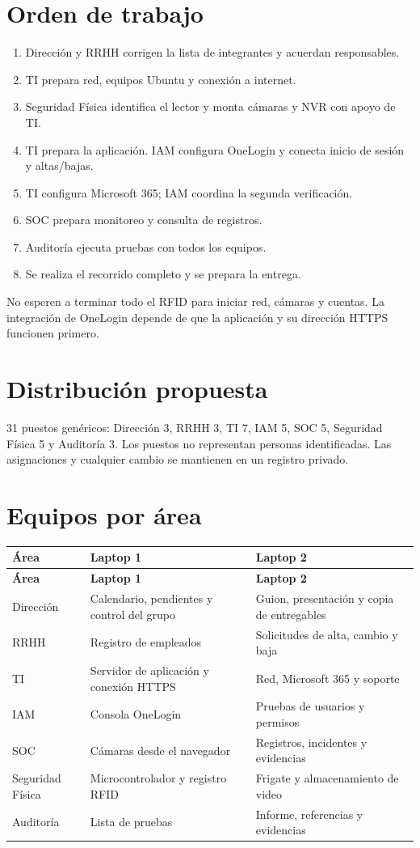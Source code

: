 \documentclass[12pt,a4paper]{article}
\begin{document}
\section*{Orden de trabajo}
\begin{enumerate}
\item Dirección y RRHH corrigen la lista de integrantes y acuerdan responsables.
\item TI prepara red, equipos Ubuntu y conexión a internet.
\item Seguridad Física identifica el lector y monta cámaras y NVR con apoyo de TI.
\item TI prepara la aplicación. IAM configura OneLogin y conecta inicio de sesión y altas/bajas.
\item TI configura Microsoft 365; IAM coordina la segunda verificación.
\item SOC prepara monitoreo y consulta de registros.
\item Auditoría ejecuta pruebas con todos los equipos.
\item Se realiza el recorrido completo y se prepara la entrega.
\end{enumerate}
No esperen a terminar todo el RFID para iniciar red, cámaras y cuentas. La integración de OneLogin depende de que la aplicación y su dirección HTTPS funcionen primero.\par
{}\section*{Distribución propuesta}
31 puestos genéricos: Dirección 3, RRHH 3, TI 7, IAM 5, SOC 5, Seguridad Física 5 y Auditoría 3. Los puestos no representan personas identificadas. Las asignaciones y cualquier cambio se mantienen en un registro privado.\par
{}\section*{Equipos por área}
{\small\renewcommand{\arraystretch}{1.2}
\begin{longtable}{p{5.027cm}p{5.027cm}p{5.027cm}}
\toprule
\textbf{Área} & \textbf{Laptop 1} & \textbf{Laptop 2} \\ \midrule\endfirsthead
\textbf{Área} & \textbf{Laptop 1} & \textbf{Laptop 2} \\ \midrule\endhead
Dirección & Calendario, pendientes y control del grupo & Guion, presentación y copia de entregables \\
RRHH & Registro de empleados & Solicitudes de alta, cambio y baja \\
TI & Servidor de aplicación y conexión HTTPS & Red, Microsoft 365 y soporte \\
IAM & Consola OneLogin & Pruebas de usuarios y permisos \\
SOC & Cámaras desde el navegador & Registros, incidentes y evidencias \\
Seguridad Física & Microcontrolador y registro RFID & Frigate y almacenamiento de video \\
Auditoría & Lista de pruebas & Informe, referencias y evidencias \\
\bottomrule\end{longtable}}
\end{document}
